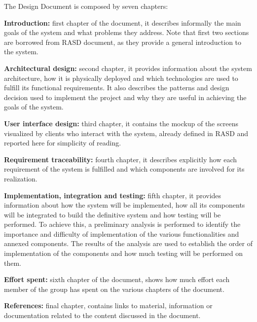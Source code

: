 The Design Document is composed by seven chapters:

\textbf{Introduction:} first chapter of the document, it describes informally the main goals of the system and what problems they address. Note that first two sections are borrowed from RASD document, as they provide a general introduction to the system.

\textbf{Architectural design:} second chapter, it provides information about the system architecture, how it is physically deployed and which technologies are used to fulfill its functional requirements. It also describes the patterns and design decision used to implement the project and why they are useful in achieving the goals of the system.

\textbf{User interface design:} third chapter, it contains the mockup of the screens visualized by clients who interact with the system, already defined in RASD and reported here for simplicity of reading.

\textbf{Requirement traceability:} fourth chapter, it describes explicitly how each requirement of the system is fulfilled and which components are involved for its realization.

\textbf{Implementation, integration and testing:} fifth chapter, it provides information about how the system will be implemented, how all its components will be integrated to build the definitive system and how testing will be performed. To achieve this, a preliminary analysis is performed to identify the importance and difficulty of implementation of the various functionalities and annexed components. The results of the analysis are used to establish the order of implementation of the components and how much testing will be performed on them.

\textbf{Effort spent:} sixth chapter of the document, shows how much effort each member of the group has spent on the various chapters of the document.

\textbf{References:} final chapter, contains links to material, information or documentation related to the content discussed in the document.


